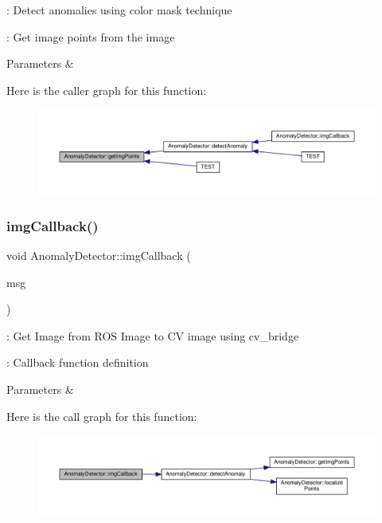 \+: Detect anomalies using color mask technique 

\+: Get image points from the image


\begin{DoxyParams}{Parameters}
{\em } & \\
\hline
\end{DoxyParams}
Here is the caller graph for this function\+:\nopagebreak
\begin{figure}[H]
\begin{center}
\leavevmode
\includegraphics[width=350pt]{class_anomaly_detector_aaaa09563dc7e8f76609b9e9b9e901dce_icgraph}
\end{center}
\end{figure}
\mbox{\label{class_anomaly_detector_a03f147d46834d55a0d1630d91afa1334}} 
\subsubsection{\texorpdfstring{img\+Callback()}{imgCallback()}}
{\footnotesize\ttfamily void Anomaly\+Detector\+::img\+Callback (\begin{DoxyParamCaption}\item[{const sensor\+\_\+msgs\+::\+Image\+::\+Const\+Ptr \&}]{msg }\end{DoxyParamCaption})}



\+: Get Image from R\+OS Image to CV image using cv\+\_\+bridge 

\+: Callback function definition


\begin{DoxyParams}{Parameters}
{\em } & \\
\hline
\end{DoxyParams}
Here is the call graph for this function\+:\nopagebreak
\begin{figure}[H]
\begin{center}
\leavevmode
\includegraphics[width=350pt]{class_anomaly_detector_a03f147d46834d55a0d1630d91afa1334_cgraph}
\end{center}
\end{figure}
\mbox{\label{class_anomaly_detector_aa97b11cf22fdd64d5f38e4d49025bda1}} 
